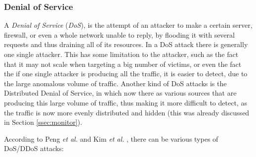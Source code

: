\documentclass[runningheads,a4paper]{llncs}
\begin{document}
\subsubsection{Denial of Service}
A \textit{Denial of Service} (\textit{DoS}), is the attempt of an attacker to make a certain server, firewall, or even a whole network unable to reply, by flooding it with several requests and thus draining all of its resources. In a DoS attack there is generally one single attacker. This has some limitation to the attacker, such as the fact that it may not scale when targeting a big number of victims, or even the fact the if one single attacker is producing all the traffic, it is easier to detect, due to the large anomalous volume of traffic. Another kind of DoS attacks is the Distributed Denial of Service, in which now there as various sources that are producing this large volume of traffic, thus making it more difficult to detect, as the traffic is now more evenly distributed and hidden (this was already discussed in Section \ref{ssec:monitor}).

According to Peng \textit{et al.} \cite{Peng2007} and Kim \textit{et al.} \cite{kim2004flow}, there can be various types of DoS/DDoS attacks:
\end{document}
